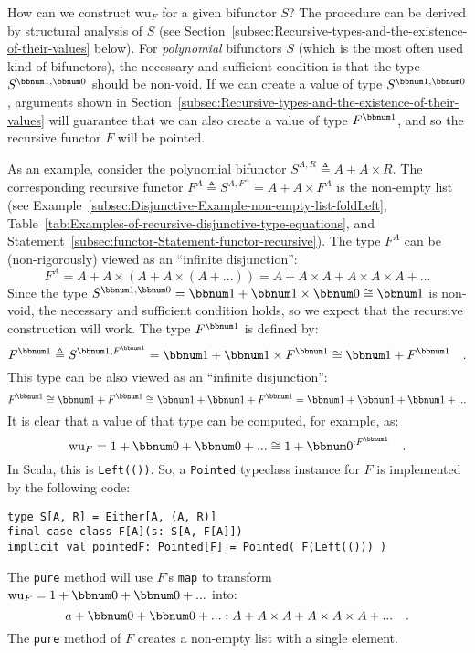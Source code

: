 How can we construct $\text{wu}_{F}$ for a given bifunctor $S$?
The procedure can be derived by structural analysis of $S$ (see Section~\ref{subsec:Recursive-types-and-the-existence-of-their-values}
below). For \emph{polynomial} bifunctors $S$ (which is the most often
used kind of bifunctors), the necessary and sufficient condition is
that the type $S^{\bbnum 1,\bbnum 0}$ should be non-void. If we can
create a value of type $S^{\bbnum 1,\bbnum 0}$ , arguments shown
in Section~\ref{subsec:Recursive-types-and-the-existence-of-their-values}
will guarantee that we can also create a value of type $F^{\bbnum 1}$,
and so the recursive functor $F$ will be pointed.

As an example, consider the polynomial bifunctor $S^{A,R}\triangleq A+A\times R$.
The corresponding recursive functor $F^{A}\triangleq S^{A,F^{A}}=A+A\times F^{A}$
is the non-empty list (see Example~\ref{subsec:Disjunctive-Example-non-empty-list-foldLeft},
Table~\ref{tab:Examples-of-recursive-disjunctive-type-equations},
and Statement~\ref{subsec:functor-Statement-functor-recursive}).
The type $F^{A}$ can be (non-rigorously) viewed as an \textsf{``}infinite
disjunction\textsf{''}:
\[
F^{A}=A+A\times(A+A\times\left(A+...\right))=A+A\times A+A\times A\times A+...
\]
Since the type $S^{\bbnum 1,\bbnum 0}=\bbnum 1+\bbnum 1\times\bbnum 0\cong\bbnum 1$
is non-void, the necessary and sufficient condition holds, so we expect
that the recursive construction will work. The type $F^{\bbnum 1}$
is defined by:
\[
F^{\bbnum 1}\triangleq S^{\bbnum 1,F^{\bbnum 1}}=\bbnum 1+\bbnum 1\times F^{\bbnum 1}\cong\bbnum 1+F^{\bbnum 1}\quad.
\]
This type can be also viewed as an \textsf{``}infinite disjunction\textsf{''}:
\[
F^{\bbnum 1}\cong\bbnum 1+F^{\bbnum 1}\cong\bbnum 1+\bbnum 1+F^{\bbnum 1}=\bbnum 1+\bbnum 1+\bbnum 1+...
\]
It is clear that a value of that type can be computed, for example,
as:
\[
\text{wu}_{F}=1+\bbnum 0+\bbnum 0+...\cong1+\bbnum 0^{:F^{\bbnum 1}}\quad.
\]
In Scala, this is \lstinline!Left(())!. So, a \lstinline!Pointed!
typeclass instance for $F$ is implemented by the following code:
\begin{lstlisting}
type S[A, R] = Either[A, (A, R)]
final case class F[A](s: S[A, F[A]])
implicit val pointedF: Pointed[F] = Pointed( F(Left(())) )
\end{lstlisting}

The  \lstinline!pure! method will use $F$\textsf{'}s \lstinline!map! to
transform $\text{wu}_{F}=1+\bbnum 0+\bbnum 0+...$ into:
\[
a+\bbnum 0+\bbnum 0+...:A+A\times A+A\times A\times A+...\quad.
\]
The \lstinline!pure! method of $F$ creates a non-empty list with
a single element.

